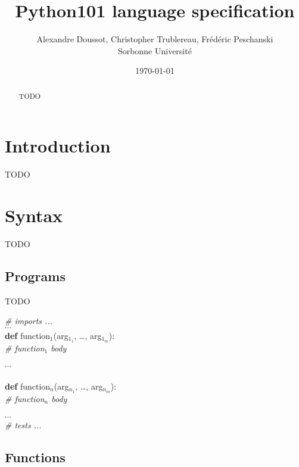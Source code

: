 \documentclass[a4paper]{article}
\newenvironment{program}{
\begin{sffamily}
\begin{scriptsize}
\begin{tabbing}}
{\end{tabbing}
\end{scriptsize}
\end{sffamily}}
\newcommand{\kw}[1]{\textsf{\textbf{#1}}}
\newcommand{\cmt}[1]{\textsf{\textit{#1}}}
\newcommand{\pindent}{\hspace{2em}\=}
\begin{document}
\setlength{\parskip}{1ex}
\setlength{\parindent}{0mm}


\title{Python101 language specification}

\author{Alexandre Doussot, Christopher Trublereau, Frédéric Peschanski\\
Sorbonne Université}

\date{\today}

\maketitle
\begin{abstract}
TODO
\end{abstract}

\thispagestyle{fancy}

\section{Introduction}

TODO

\section{Syntax}

TODO

\subsection{Programs}

TODO

\begin{program}
\cmt{\# imports ...}\\
$\cdots$\\
\kw{def} function$_1$(arg$_{1_1}$, \ldots, arg$_{1_m}$):\\
\pindent \cmt{\# function$_1$ body}\\
\\
$\cdots$ \\
\\
\kw{def} function$_n$(arg$_{n_1}$, \ldots, arg$_{n_m}$):\\
\> \cmt{\# function$_n$ body}\\
\\
$\cdots$\\
\cmt{\# tests ...} \\
\end{program}

\subsection{Functions}
\end{document}
